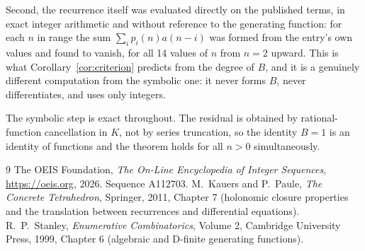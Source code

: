 \documentclass[11pt,a4paper]{article}
\theoremstyle{plain}
\theoremstyle{definition}
\begin{document}
Second, the recurrence itself was evaluated directly on the published terms, in exact
integer arithmetic and without reference to the generating function: for each $n$ in range
the sum $\sum_{i}p_{i}(n)a(n-i)$ was formed from the entry's own values and found to
vanish, for all 14 values of $n$ from $n=2$ upward. This is what
Corollary~\ref{cor:criterion} predicts from the degree of $B$, and it is a genuinely
different computation from the symbolic one: it never forms $B$, never differentiates, and
uses only integers.

The symbolic step is exact throughout. The residual is obtained by rational-function
cancellation in $K$, not by series truncation, so the identity $B=1$ is an
identity of functions and the theorem holds for all $n>0$ simultaneously.

\begin{thebibliography}{9}
 The OEIS Foundation, \emph{The On-Line Encyclopedia of Integer Sequences},
\url{https://oeis.org}, 2026. Sequence A112703.
 M.~Kauers and P.~Paule, \emph{The Concrete Tetrahedron}, Springer, 2011,
Chapter 7 (holonomic closure properties and the translation between recurrences and
differential equations).
 R.~P.~Stanley, \emph{Enumerative Combinatorics}, Volume 2, Cambridge
University Press, 1999, Chapter 6 (algebraic and D-finite generating functions).
\end{thebibliography}
\end{document}
